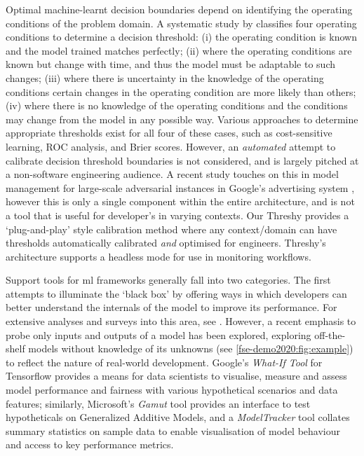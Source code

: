 
Optimal machine-learnt decision boundaries depend on identifying the operating conditions of the problem domain. A systematic study by \citet{Drummond2006} classifies four operating conditions to determine a decision threshold: (i) the operating condition is known and the model trained matches perfectly; (ii) where the operating conditions are known but change with time, and thus the model must be adaptable to such changes; (iii) where there is uncertainty in the knowledge of the operating conditions certain changes in the operating condition are more likely than others; (iv) where there is no knowledge of the operating conditions and the conditions may change from the model in any possible way. Various approaches to determine appropriate thresholds exist for all four of these cases, such as cost-sensitive learning, ROC analysis, and Brier scores. However, an \textit{automated} attempt to calibrate decision threshold boundaries is not considered, and is largely pitched at a non-software engineering audience. A recent study touches on this in model management for large-scale adversarial instances in Google's advertising system \citep{sculley2011detecting}, however this is only a single component within the entire architecture, and is not a tool that is useful for developer's in varying contexts. Our Threshy provides a `plug-and-play' style calibration method where any context/domain can have thresholds automatically calibrated \textit{and} optimised for engineers. Threshy’s architecture supports a headless mode for use in monitoring workflows.


Support tools for \gls{ml} frameworks generally fall into two categories. The first attempts to illuminate the `black box' by offering ways in which developers can better understand the internals of the model to improve its performance. For extensive analyses and surveys into this area, see \citep{Hohman2018VisualAI,Patel:2008:ISM:1357054.1357160}. However, a recent emphasis to probe only inputs and outputs of a model has been explored, exploring off-the-shelf models without  knowledge of its unknowns (see \cref{fse-demo2020:fig:example}) to reflect the nature of real-world development. Google's \textit{What-If Tool} \citep{DBLP:journals/corr/abs-1907-04135} for Tensorflow provides a means for data scientists to visualise, measure and assess model performance and fairness with various hypothetical scenarios and data features; similarly, Microsoft's \textit{Gamut} tool  \citep{hohman2019gamut} provides an interface to test hypotheticals on Generalized Additive Models, and a  \textit{ModelTracker} tool \citep{amershi2015modeltracker} collates summary statistics on sample data to enable visualisation of model behaviour and access to key performance metrics.

